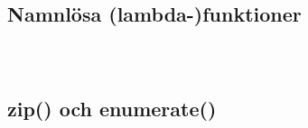 \begin{frame}[fragile]
  \begin{example}
    \inputminted[firstline=21]{python}{examples/filtering.py}
  \end{example}
\end{frame}

\subsection{Namnlösa (lambda-)funktioner}

\begin{frame}[fragile]
  \begin{example}
    \inputminted{python}{examples/filter-lambda.py}
  \end{example}
\end{frame}

\begin{frame}[fragile]
  \begin{example}
    \inputminted[firstline=7,lastline=18]{python}{examples/any-all.py}
  \end{example}
\end{frame}

\begin{frame}[fragile]
  \begin{example}
    \inputminted[firstline=20]{python}{examples/any-all.py}
  \end{example}
\end{frame}

\subsection{zip() och enumerate()}

\begin{frame}[fragile]
  \begin{example}[enum.py]
    \inputminted{python}{examples/enum.py}
  \end{example}
\end{frame}

\begin{frame}[fragile]
  \begin{example}[zip.py]
    \inputminted{python}{examples/zip.py}
  \end{example}
\end{frame}

